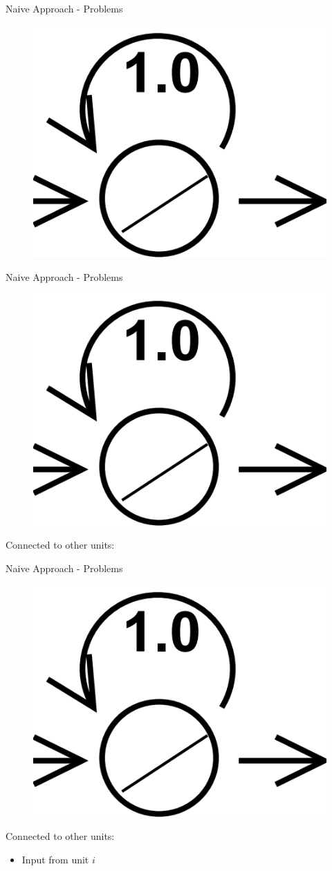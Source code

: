 \documentclass[10pt, aspectratio=169]{beamer}
\begin{document}
\begin{frame}[t]{Naive Approach - Problems}
\begin{figure}
        \centering
        \includegraphics[width=0.25\linewidth]{images/ConstantErrorCarousel.png}
    \end{figure}   
\end{frame}

\begin{frame}[t]{Naive Approach - Problems}
\begin{figure}
        \centering
        \includegraphics[width=0.25\linewidth]{images/ConstantErrorCarousel.png}
    \end{figure}
Connected to other units:
\end{frame}

\begin{frame}[t]{Naive Approach - Problems}
\begin{figure}
        \centering
        \includegraphics[width=0.25\linewidth]{images/ConstantErrorCarousel.png}
    \end{figure}
Connected to other units:
\begin{itemize}
    \item Input from unit \begin{math}i\end{math}
\end{itemize}
\end{frame}
\end{document}
